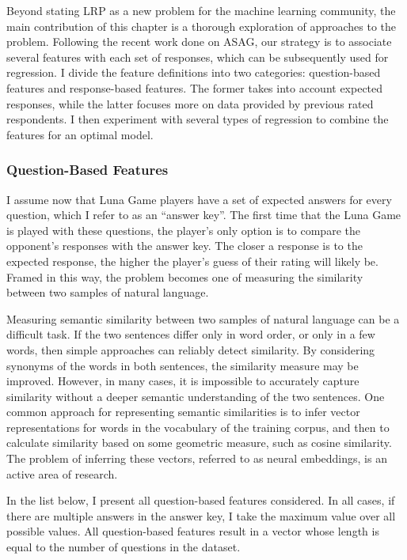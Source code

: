 Beyond stating LRP as a new problem for the machine learning community, the main contribution of this chapter is a thorough exploration of approaches to the problem. Following the recent work done on ASAG, our strategy is to associate several features with each set of responses, which can be subsequently used for regression. I divide the feature definitions into two categories: question-based features and response-based features. The former takes into account expected responses, while the latter focuses more on data provided by previous rated respondents. I then experiment with several types of regression to combine the features for an optimal model.

\subsubsection{Question-Based Features}
I assume now that Luna Game players have a set of expected answers for every question, which I refer to as an ``answer key''. The first time that the Luna Game is played with these questions, the player's only option is to compare the opponent's responses with the answer key. The closer a response is to the expected response, the higher the player's guess of their rating will likely be. Framed in this way, the problem becomes one of measuring the similarity between two samples of natural language.

Measuring semantic similarity between two samples of natural language can be a difficult task. If the two sentences differ only in word order, or only in a few words, then simple approaches can reliably detect similarity. By considering synonyms of the words in both sentences, the similarity measure may be improved. However, in many cases, it is impossible to accurately capture similarity without a deeper semantic understanding of the two sentences. One common approach for representing semantic similarities is to infer vector representations for words in the vocabulary of the training corpus, and then to calculate similarity based on some geometric measure, such as cosine similarity. The problem of inferring these vectors, referred to as neural embeddings, is an active area of research.

In the list below, I present all question-based features considered. In all cases, if there are multiple answers in the answer key, I take the maximum value over all possible values. All question-based features result in a vector whose length is equal to the number of questions in the dataset.


